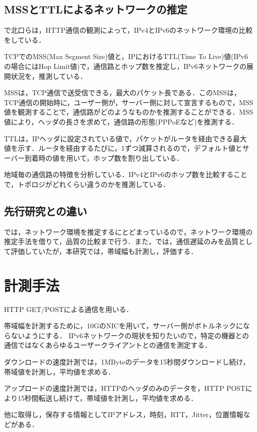 \documentclass[rinkou,a4paper]{ieicej}
\begin{document}
\subsection{MSSとTTLによるネットワークの推定}
\cite{kitaguchi2}で北口らは，HTTP通信の観測によって，IPv4とIPv6のネットワーク環境の比較をしている．

TCPでのMSS(Max Segment Size)値と，IPにおけるTTL(Time To Live)値(IPv6の場合にはHop Limit値)で，通信路とホップ数を推定し，IPv6ネットワークの展開状況を，推測している．

MSSは，TCP通信で送受信できる，最大のパケット長である．このMSSは，TCP通信の開始時に，ユーザー側が，サーバー側に対して宣言するもので，MSS値を観測することで，通信路がどのようなものかを推測することができる．MSS値により，ヘッダの長さを求めて，通信路の形態(PPPoEなど)を推測する．

TTLは，IPヘッダに設定されている値で，パケットがルータを経由できる最大値を示す．ルータを経由するたびに，1ずつ減算されるので，デフォルト値とサーバー到着時の値を用いて，ホップ数を割り出している．

地域毎の通信路の特徴を分析している．IPv4とIPv6のホップ数を比較することで，トポロジがどれくらい違うのかを推測している．

\subsection{先行研究との違い}
\cite{kitaguchi2}では，ネットワーク環境を推定するにとどまっているので，ネットワーク環境の推定手法を借りて，品質の比較まで行う．また，\cite{kitaguchi1}では，通信遅延のみを品質として評価していたが，本研究では，帯域幅も計測し，評価する．

\section{計測手法}
HTTP GET/POSTによる通信を用いる．

帯域幅を計測するために，10GのNICを用いて，サーバー側がボトルネックにならないようにする．
IPv6ネットワークの現状を知りたいので，特定の機器との通信ではなくあらゆるユーザークライアントとの通信を測定する．

ダウンロードの速度計測では，1MByteのデータを15秒間ダウンロードし続け，帯域値を計測し，平均値を求める．

アップロードの速度計測では，HTTPのヘッダのみのデータを，HTTP POSTにより15秒間転送し続けて，帯域値を計測し，平均値を求める．

他に取得し，保存する情報としてIPアドレス，時刻，RTT，Jitter，位置情報などがある．
\end{document}
